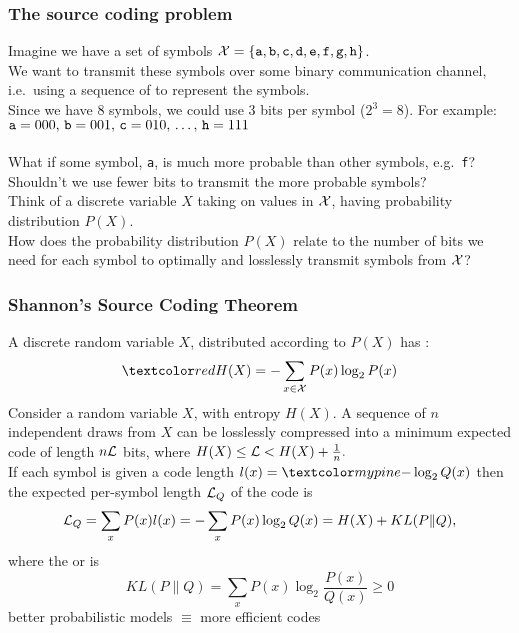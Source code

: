 \begin{frame}
\frametitle{The source coding problem}

Imagine we have a set of symbols ${\cal X} = \{{\tt a, b, c, d, e, f,
  g, h}\}$. \\

We want to transmit these symbols over some binary communication
channel, i.e.\ using a sequence of  to represent the
symbols. \\

Since we have 8 symbols, we could use 3 bits per symbol ($2^3 =
8$). For example:\\
${\tt a}=000, \, {\tt b}=001, \, {\tt c}=010, \, \ldots, \, {\tt h}=111$ \\[2ex]

 \\[2ex]

What if some symbol, {\tt a}, is much more probable than other
symbols, e.g.\ {\tt f}? \\
Shouldn't we use fewer bits to transmit the
more probable symbols? \\[2ex]

Think of a discrete variable $X$ taking on values in $\cal X$,
having probability distribution $P(X)$. \\[1ex]

How does the probability distribution $P(X)$ relate to the number of
bits we need for each symbol to optimally and losslessly
transmit symbols from 
${\cal X}$? 

\end{frame}
\begin{frame}
\frametitle{Shannon's Source Coding Theorem}

A discrete random variable $X$, distributed according to $P(X)$ has
:
%
\vspace*{-1ex}
\[
\Red{H(X) = - \sum_{x \in \mathcal{X}} P(x) \log_2 P(x)} 
\] 
%
 Consider a random variable $X$,
with entropy $H(X)$. A sequence of $n$ independent draws from $X$
can be losslessly compressed into a minimum expected code of length $n
{\cal L}$ bits, where $H(X) \le {\cal L} < H(X)+\frac{1}{n}.$ \\[2ex]

If each symbol is given a code length $l(x) = \Green{- \log_2 Q(x)}$
then the expected per-symbol length ${\cal L}_Q$ of the code is
%
\vspace*{-1ex}
\[
{\cal L}_Q = \sum_x P(x) l(x) = - \sum_x P(x) \log_2 Q(x) = H(X) + KL(P\|Q),
\]
%
\vspace*{-1ex}
where the  or  is 
%
\[
KL(P\|Q) = \sum_x P(x) \log_2 \frac{P(x)}{Q(x)} \ge 0
\]
%
 better probabilistic models $\equiv$ more
efficient codes

\end{frame}
